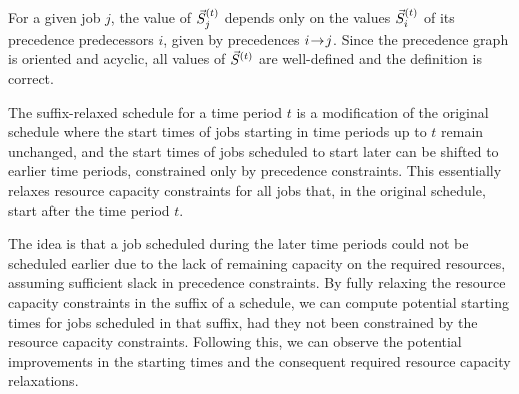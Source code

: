 
For a given job $j$, the value of $\vec{S}^{(t)}_{j}$
depends only on the values $\vec{S}^{(t)}_{i}$ of its precedence predecessors $i$,
given by precedences $i \hspace{-0.2em} \rightarrow \hspace{-0.2em} j$.
Since the precedence graph is oriented and acyclic,
all values of $\vec{S}^{(t)}$ are well-defined and the definition is correct.

The suffix-relaxed schedule for a time period $t$ is a modification of the original schedule
where the start times of jobs starting in time periods up to $t$ remain unchanged,
and the start times of jobs scheduled to start later can be shifted to earlier time periods,
constrained only by precedence constraints.
This essentially relaxes resource capacity constraints for all jobs that, in the original schedule,
start after the time period $t$.

The idea is that a job scheduled during the later time periods could not be scheduled earlier
due to the lack of remaining capacity on the required resources,
assuming sufficient slack in precedence constraints.
By fully relaxing the resource capacity constraints in the suffix of a schedule,
we can compute potential starting times for jobs scheduled in that suffix,
had they not been constrained by the resource capacity constraints.
Following this, we can observe the potential improvements in the starting times
and the consequent required resource capacity relaxations.

